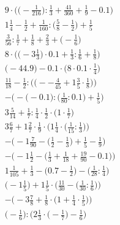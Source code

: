 \documentclass[8pt]{article}
\begin{document}
\begin{align}
9 \cdot \Big(\big(-\frac{1}{216}\big) : \frac{1}{3} + \frac{41}{360} + \frac{1}{9} - 0.1\Big) \\
1\frac{1}{4} - \frac{1}{2} + \frac{1}{160} : \big(\frac{5}{8} - \frac{1}{2}\big) + \frac{1}{5} \\
\frac{3}{56} : \frac{1}{7} + \frac{1}{8} + \frac{2}{3} + \big(-\frac{1}{6}\big) \\
8 \cdot \Big(\big(-3\frac{1}{3}\big) \cdot 0.1 + \frac{1}{3} : \frac{1}{6} + \frac{1}{8}\Big) \\
\big(-44.9\big) - 0.1 \cdot \big(8 \cdot 0.1 \cdot \frac{1}{4}\big) \\
\frac{11}{18} - \frac{1}{2} : \Big(\big(--\frac{4}{45} + 1\frac{3}{5} \cdot \frac{1}{8}\big)\Big) \\
-\Big(-\big(-0.1\big) : \big(\frac{1}{80} : 0.1\big) + \frac{1}{5}\Big) \\
3\frac{5}{14} + \frac{1}{7} : \frac{1}{4} \cdot \frac{1}{2} \cdot \big(1 \cdot \frac{1}{7}\big) \\
3\frac{6}{7} + 1\frac{2}{7} \cdot \frac{1}{9} \cdot \Big(1\frac{1}{4} \cdot \big(\frac{1}{15} : \frac{1}{3}\big)\Big) \\
-\Big(-1\frac{7}{90} - \big(\frac{1}{2} - \frac{1}{3}\big) + \frac{1}{5} - \frac{1}{9}\Big) \\
-\Big(-1\frac{1}{2} - \big(\frac{1}{3} + \frac{1}{18} + \frac{19}{90} - 0.1\big)\Big) \\
1\frac{1}{105} + \frac{1}{3} - \big(0.7 - \frac{1}{2}\big) - \big(\frac{1}{28} : \frac{1}{4}\big) \\
\Big(-1\frac{1}{5}\Big) + 1\frac{1}{5} \cdot \Big(\frac{11}{30} - \big(\frac{1}{30} : \frac{1}{6}\big)\Big) \\
-\Big(-3\frac{7}{8} + \frac{1}{8} \cdot \big(1 + \frac{1}{4} \cdot \frac{1}{5}\big)\Big) \\
\Big(-\frac{1}{6}\Big) : \Big(2\frac{1}{3} \cdot \big(-\frac{1}{7}\big) - \frac{1}{6}\Big)
\end{align}
\end{document}
